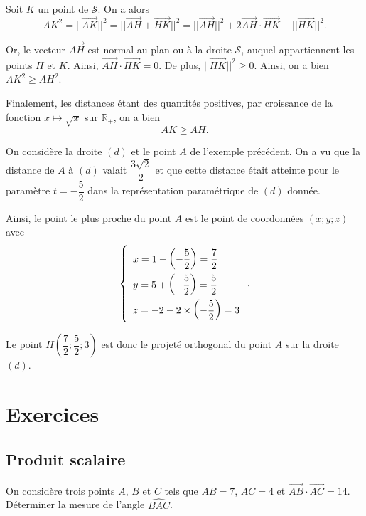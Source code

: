 \documentclass[11pt,fleqn, openany]{book} %
\begin{document}
\begin{demonstration} Soit $K$ un point de $\mathcal{S}$. On a alors\[ AK^2 = \lvert\lvert \overrightarrow{AK}\rvert\rvert^2 = \lvert\lvert\overrightarrow{AH}+\overrightarrow{HK}\rvert\rvert^2 = \lvert\lvert\overrightarrow{AH}\rvert\rvert^2 + 2 \overrightarrow{AH}\cdot \overrightarrow{HK} + \lvert\lvert\overrightarrow{HK}\rvert\rvert^2 .\]

Or, le vecteur $\overrightarrow{AH}$ est normal au plan ou à la droite $\mathcal{S}$, auquel appartiennent les points $H$ et $K$. Ainsi, $\overrightarrow{AH}\cdot \overrightarrow{HK}=0$. De plus, $\lvert\lvert\overrightarrow{HK}\rvert\rvert^2 \geqslant 0$. Ainsi, on a bien $AK^2 \geqslant AH ^2$.

Finalement, les distances étant des quantités positives, par croissance de la fonction $x \mapsto \sqrt{x}$ sur $\mathbb{R}_+$, on a bien
\[ AK \geqslant AH. \]\end{demonstration}

\begin{example}On considère la droite $(d)$ et le point $A$ de l'exemple précédent. On a vu que la distance de $A$ à $(d)$ valait $\dfrac{3\sqrt{2}}{2}$ et que cette distance était atteinte pour le paramètre $t=-\dfrac{5}{2}$ dans la représentation paramétrique de $(d)$ donnée.

Ainsi, le point le plus proche du point $A$ est le point de coordonnées $(x;y;z)$ avec
\[\left\{\renewcommand{\arraystretch}{2} \begin{array}{l}x=1-\left(-\dfrac{5}{2}\right)=\dfrac{7}{2} \\ y=5+\left(-\dfrac{5}{2}\right)=\dfrac{5}{2} \\ z = -2-2 \times \left(-\dfrac{5}{2}\right)=3 \\\end{array}\right. .\]

Le point $H\left(\dfrac{7}{2};\dfrac{5}{2};3\right)$ est donc le projeté orthogonal du point $A$ sur la droite $(d)$.\end{example}

\chapter{Exercices}

\section*{Produit scalaire}

\begin{exercise}On considère trois points $A$, $B$ et $C$ tels que $AB=7$, $AC=4$ et $\overrightarrow{AB}\cdot \overrightarrow{AC}=14$. Déterminer la mesure de l'angle $\widehat{BAC}$.\end{exercise}
\end{document}
